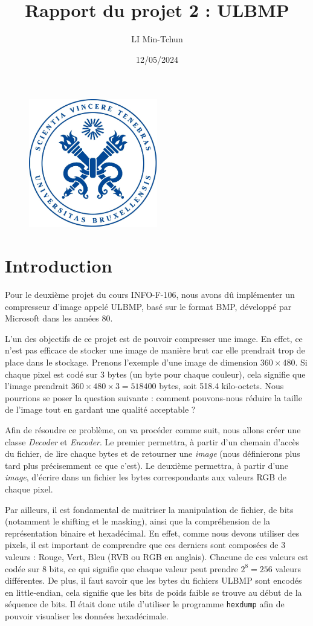 \documentclass[utf8]{article}
\title{Rapport du projet 2 : ULBMP}
\author{LI Min-Tchun}
\date{12/05/2024}
\begin{document}
\maketitle
\begin{figure}[H]
\centering
\includegraphics[width=0.5\textwidth]{logo.png}
\label{fig:logo}
\end{figure}

\newpage
\tableofcontents
\newpage
\section{Introduction}
Pour le deuxième projet du cours INFO-F-106, nous avons dû implémenter un compresseur d'image appelé ULBMP, basé sur le format BMP, développé par Microsoft dans les années 80.

L'un des objectifs de ce projet est de pouvoir compresser une image. En effet, ce n'est pas efficace de stocker une image de manière brut car elle prendrait trop de place dans le stockage. Prenons l'exemple d'une image de dimension $360 \times 480$. Si chaque pixel est codé sur 3 bytes (un byte pour chaque couleur), cela signifie que l'image prendrait $360 \times 480 \times 3 = 518400$ bytes, soit 518.4 kilo-octets. Nous pourrions se poser la question suivante : comment pouvons-nous réduire la taille de l'image tout en gardant une qualité acceptable ?

Afin de résoudre ce problème, on va procéder comme suit, nous allons créer une classe \textit{Decoder} et \textit{Encoder}. Le premier permettra, à partir d'un chemain d'accès du fichier, de lire chaque bytes et de retourner une \textit{image} (nous définierons plus tard plus précisemment ce que c'est). Le deuxième permettra, à partir d'une \textit{image}, d'écrire dans un fichier les bytes correspondants aux valeurs RGB de chaque pixel.

Par ailleurs, il est fondamental de maitriser la manipulation de fichier, de bits (notamment le shifting et le masking), ainsi que la compréhension de la représentation binaire et hexadécimal. En effet, comme nous devons utiliser des pixels, il est important de comprendre que ces derniers sont composées de 3 valeurs : Rouge, Vert, Bleu (RVB ou RGB en anglais). Chacune de ces valeurs est codée sur 8 bits, ce qui signifie que chaque valeur peut prendre $2^8 = 256$ valeurs différentes. De plus, il faut savoir que les bytes du fichiers ULBMP sont encodés en little-endian, cela signifie que les bits de poids faible se trouve au début de la séquence de bits. Il était donc utile d'utiliser le programme \texttt{hexdump} afin de pouvoir visualiser les données hexadécimale.
\end{document}
